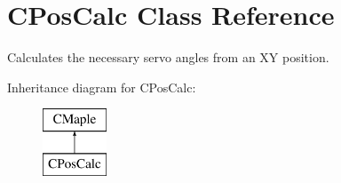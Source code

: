 \hypertarget{class_c_pos_calc}{
\section{CPosCalc Class Reference}
\label{class_c_pos_calc}
}


Calculates the necessary servo angles from an XY position.  


Inheritance diagram for CPosCalc:\begin{figure}[H]
\begin{center}
\leavevmode
\includegraphics[height=2.000000cm]{class_c_pos_calc}
\end{center}
\end{figure}

